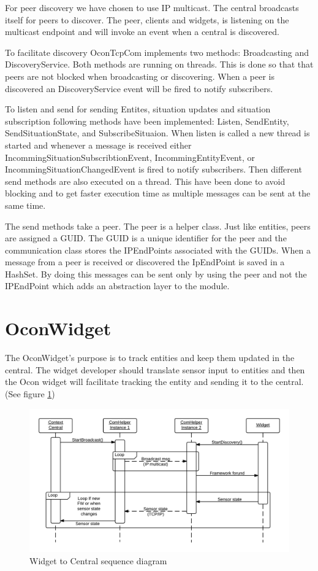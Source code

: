 \documentclass[../report.tex]{subfiles}
\begin{document}
For peer discovery we have chosen to use IP multicast. The central broadcasts itself for peers to discover. The peer, clients and widgets, is listening on the multicast endpoint and will invoke an event when a central is discovered.

To facilitate discovery OconTcpCom implements two methods: Broadcasting and DiscoveryService. Both methods are running on threads. This is done so that that peers are not blocked when broadcasting or discovering. When a peer is discovered an DiscoveryService event will be fired to notify subscribers.

To listen and send for sending Entites, situation updates and situation subscription following methods have been implemented: Listen, SendEntity, SendSituationState, and SubscribeSituaion. When listen is called a new thread is started and whenever a message is received either IncommingSituationSubscribtionEvent, IncommingEntityEvent, or IncommingSituationChangedEvent is fired to notify subscribers. Then different send methods are also executed on a thread. This have been done to avoid blocking and to get faster execution time as multiple messages can be sent at the same time.

The send methods take a peer. The peer is a helper class. Just like entities, peers are assigned a GUID. The GUID is a unique identifier for the peer and the communication class stores the IPEndPoints associated with the GUIDs. When a message from a peer is received or discovered the IpEndPoint is saved in a HashSet. By doing this messages can be sent only by using the peer and not the IPEndPoint which adds an abstraction layer to the module. 

\section{OconWidget}
\label{sec:OconWidget}

The OconWidget's purpose is to track entities and keep them updated in the central. The widget developer should translate sensor input to entities and then the Ocon widget will facilitate tracking the entity and sending it to the central. (See figure \ref{fig:widgetComHelper})

\begin{figure}
\hspace{-70px}
\includegraphics[width=500px]{comHelperSequence-widget.png}
\caption{Widget to Central sequence diagram}
\label{fig:widgetComHelper}
\end{figure}
\end{document}
